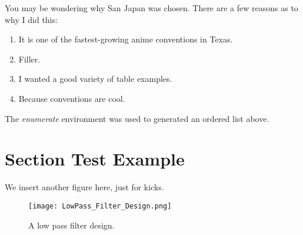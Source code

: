 You may be wondering why San Japan was chosen. There are a few reasons as to why I did this:

\begin{enumerate}
\item It is one of the fastest-growing anime conventions in Texas.
\item Filler.
\item I wanted a good variety of table examples.
\item Because conventions are cool.
\end{enumerate}

The \textit{enumerate} environment was used to generated an ordered list above.

\section{Section Test Example}
We insert another figure here, just for kicks.

\begin{figure}[h!]
	\centering
	\texttt{[image: LowPass\_Filter\_Design.png]}
	\caption{A low pass filter design.}
\end{figure}
